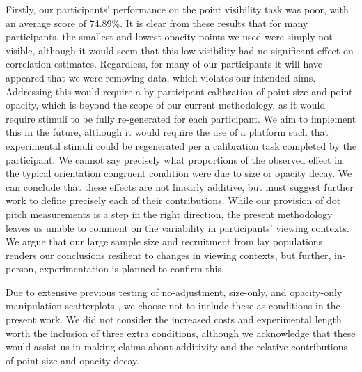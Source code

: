 \documentclass[sigconf]{acmart}
\begin{document}
Firstly, our participants' performance on the point visibility task was
poor, with an average score of 74.89\%. It is clear from these results
that for many participants, the smallest and lowest opacity points we
used were simply not visible, although it would seem that this low
visibility had no significant effect on correlation estimates.
Regardless, for many of our participants it will have appeared that we
were removing data, which violates our intended aims. Addressing this
would require a by-participant calibration of point size and point
opacity, which is beyond the scope of our current methodology, as it
would require stimuli to be fully re-generated for each participant. We
aim to implement this in the future, although it would require the use
of a platform such that experimental stimuli could be regenerated per a
calibration task completed by the participant. We cannot say precisely
what proportions of the observed effect in the typical orientation
congruent condition were due to size or opacity decay. We can conclude
that these effects are not linearly additive, but must suggest further
work to define precisely each of their contributions. While our
provision of dot pitch measurements is a step in the right direction,
the present methodology leaves us unable to comment on the variability
in participants' viewing contexts. We argue that our large sample size
and recruitment from lay populations renders our conclusions resilient
to changes in viewing contexts, but further, in-person, experimentation
is planned to confirm this.

Due to extensive previous testing of no-adjustment, size-only, and
opacity-only manipulation scatterplots
\citep{strain_2023, strain_2023b}, we choose not to include these as
conditions in the present work. We did not consider the increased costs
and experimental length worth the inclusion of three extra conditions,
although we acknowledge that these would assist us in making claims
about additivity and the relative contributions of point size and
opacity decay.
\end{document}

